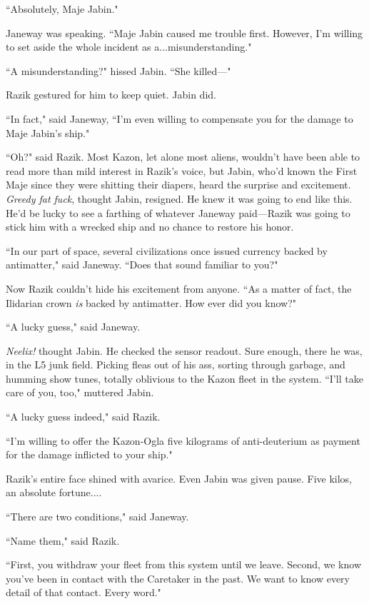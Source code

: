 \documentclass[twoside,letterpaper,12pt]{memoir}
\begin{document}
``Absolutely, Maje Jabin."

Janeway was speaking. ``Maje Jabin caused me trouble first. However, I'm willing to set aside the whole incident as a...misunderstanding."

``A misunderstanding?" hissed Jabin. ``She killed---"

Razik gestured for him to keep quiet. Jabin did.

``In fact," said Janeway, ``I'm even willing to compensate you for the damage to Maje Jabin's ship."

``Oh?" said Razik. Most Kazon, let alone most aliens, wouldn't have been able to read more than mild interest in Razik's voice, but Jabin, who'd known the First Maje since they were shitting their diapers, heard the surprise and excitement. \textit{Greedy fat fuck}, thought Jabin, resigned. He knew it was going to end like this. He'd be lucky to see a farthing of whatever Janeway paid---Razik was going to stick him with a wrecked ship and no chance to restore his honor.

``In our part of space, several civilizations once issued currency backed by antimatter," said Janeway. ``Does that sound familiar to you?"

Now Razik couldn't hide his excitement from anyone. ``As a matter of fact, the Ilidarian crown \textit{is} backed by antimatter. How ever did you know?"

``A lucky guess," said Janeway.

\textit{Neelix!} thought Jabin. He checked the sensor readout. Sure enough, there he was, in the L5 junk field. Picking fleas out of his ass, sorting through garbage, and humming show tunes, totally oblivious to the Kazon fleet in the system. ``I'll take care of you, too," muttered Jabin.

``A lucky guess indeed," said Razik.

``I'm willing to offer the Kazon-Ogla five kilograms of anti-deuterium as payment for the damage inflicted to your ship."

Razik's entire face shined with avarice. Even Jabin was given pause. Five kilos, an absolute fortune....

``There are two conditions," said Janeway.

``Name them," said Razik.

``First, you withdraw your fleet from this system until we leave. Second, we know you've been in contact with the Caretaker in the past. We want to know every detail of that contact. Every word."
\end{document}
